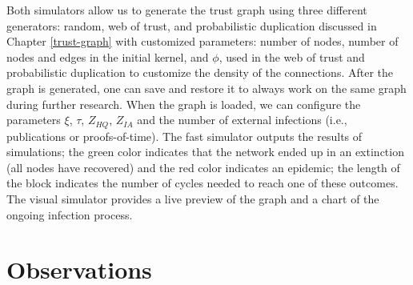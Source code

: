 Both simulators allow us to generate the trust graph using three different generators: random, web of trust, and probabilistic duplication discussed in Chapter \ref{trust-graph} with customized parameters: number of nodes, number of nodes and edges in the initial kernel, and $\phi$, used in the web of trust and probabilistic duplication to customize the density of the connections. After the graph is generated, one can save and restore it to always work on the same graph during further research. 
When the graph is loaded, we can configure the parameters $\xi$, $\tau$, $Z_{HQ}$, $Z_{IA}$ and the number of external infections (i.e., publications or proofs-of-time).
The fast simulator outputs the results of simulations; the green color indicates that the network ended up in an extinction (all nodes have recovered) and the red color indicates an epidemic; the length of the block indicates the number of cycles needed to reach one of these outcomes. The visual simulator provides a live preview of the graph and a chart of the ongoing infection process.  


\section{Observations}
\label{observations}

